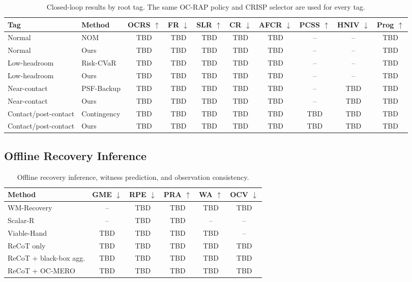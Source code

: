\documentclass[conference]{IEEEtran}
\begin{document}
\begin{table}[t]
\centering
\footnotesize
\caption{Closed-loop results by root tag.  The same OC-RAP policy and CRISP selector are used for every tag.}
\label{tab:regime_results}
\begin{tabular}{llcccccccc}
\toprule
Tag & Method & OCRS $\uparrow$ & FR $\downarrow$ & SLR $\uparrow$ & CR $\downarrow$ & AFCR $\downarrow$ & PCSS $\uparrow$ & HNIV $\downarrow$ & Prog $\uparrow$ \\
\midrule
Normal & NOM & TBD & TBD & TBD & TBD & TBD & -- & -- & TBD \\
Normal & Ours & TBD & TBD & TBD & TBD & TBD & -- & -- & TBD \\
Low-headroom & Risk-CVaR & TBD & TBD & TBD & TBD & TBD & -- & -- & TBD \\
Low-headroom & Ours & TBD & TBD & TBD & TBD & TBD & -- & -- & TBD \\
Near-contact & PSF-Backup & TBD & TBD & TBD & TBD & TBD & -- & TBD & TBD \\
Near-contact & Ours & TBD & TBD & TBD & TBD & TBD & -- & TBD & TBD \\
Contact/post-contact & Contingency & TBD & TBD & TBD & TBD & TBD & TBD & TBD & TBD \\
Contact/post-contact & Ours & TBD & TBD & TBD & TBD & TBD & TBD & TBD & TBD \\
\bottomrule
\end{tabular}
\end{table}

\subsection{Offline Recovery Inference}
\label{subsec:offline_results}

\begin{table}[t]
\centering
\caption{Offline recovery inference, witness prediction, and observation consistency.}
\label{tab:offline_recovery}
\begin{tabular}{lccccc}
\toprule
Method & GME $\downarrow$ & RPE $\downarrow$ & PRA $\uparrow$ & WA $\uparrow$ & OCV $\downarrow$ \\
\midrule
WM-Recovery & -- & TBD & TBD & TBD & TBD \\
Scalar-R & -- & TBD & TBD & -- & -- \\
Viable-Hand & TBD & TBD & TBD & TBD & -- \\
ReCoT only & TBD & TBD & TBD & TBD & TBD \\
ReCoT + black-box agg. & TBD & TBD & TBD & TBD & TBD \\
ReCoT + OC-MERO & TBD & TBD & TBD & TBD & TBD \\
\bottomrule
\end{tabular}
\end{table}
\end{document}
